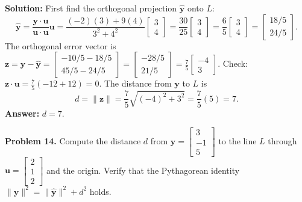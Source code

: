 \documentclass[11pt, letterpaper]{article}
\theoremstyle{definition}
\theoremstyle{remark}
\begin{document}
\textbf{Solution:} First find the orthogonal projection $\hat{\mathbf{y}}$ onto $L$:
\[
\hat{\mathbf{y}} = \frac{\mathbf{y} \cdot \mathbf{u}}{\mathbf{u} \cdot \mathbf{u}}\mathbf{u} = \frac{(-2)(3) + 9(4)}{3^2 + 4^2}\begin{bmatrix} 3 \\ 4 \end{bmatrix} = \frac{30}{25}\begin{bmatrix} 3 \\ 4 \end{bmatrix} = \frac{6}{5}\begin{bmatrix} 3 \\ 4 \end{bmatrix} = \begin{bmatrix} 18/5 \\ 24/5 \end{bmatrix}.
\]
The orthogonal error vector is $\mathbf{z} = \mathbf{y} - \hat{\mathbf{y}} = \begin{bmatrix} -10/5 - 18/5 \\ 45/5 - 24/5 \end{bmatrix} = \begin{bmatrix} -28/5 \\ 21/5 \end{bmatrix} = \frac{7}{5}\begin{bmatrix} -4 \\ 3 \end{bmatrix}$. Check: $\mathbf{z} \cdot \mathbf{u} = \frac{7}{5}(-12 + 12) = 0$. The distance from $\mathbf{y}$ to $L$ is
\[
d = \|\mathbf{z}\| = \frac{7}{5}\sqrt{(-4)^2 + 3^2} = \frac{7}{5}(5) = 7.
\]
\textbf{Answer:} $d = 7$.

\textbf{Problem 14.} Compute the distance $d$ from $\mathbf{y} = \begin{bmatrix} 3 \\ -1 \\ 5 \end{bmatrix}$ to the line $L$ through $\mathbf{u} = \begin{bmatrix} 2 \\ 1 \\ 2 \end{bmatrix}$ and the origin. Verify that the Pythagorean identity $\|\mathbf{y}\|^2 = \|\hat{\mathbf{y}}\|^2 + d^2$ holds.
\end{document}

